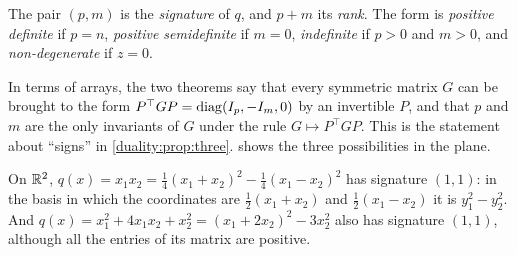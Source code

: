 \begin{notechapter}
\begin{definition}[Signature]\label{spectral-svd:def:signature}
The pair $(p, m)$ is the \emph{signature} of $q$, and $p + m$ its
\emph{rank}. The form is \emph{positive definite} if $p = n$,
\emph{positive semidefinite} if $m = 0$, \emph{indefinite} if $p > 0$ and
$m > 0$, and \emph{non-degenerate} if $z = 0$.
\end{definition}

In terms of arrays, the two theorems say that every symmetric matrix $G$
can be brought to the form $P^\top GP = \operatorname{diag}(I_p, -I_m, 0)$ by an
invertible $P$, and that $p$ and $m$ are the only invariants of $G$ under
the rule $G\mapsto P^\top GP$. This is the statement about ``signs'' in
\cref{duality:prop:three}.  shows the
three possibilities in the plane.

\begin{example}\label{spectral-svd:ex:squares}
On $\mathbb{R}^2$, $q(x) = x_1x_2 = \frac14(x_1 + x_2)^2 - \frac14(x_1 - x_2)^2$
has signature $(1, 1)$: in the basis in which the coordinates are
$\frac12(x_1 + x_2)$ and $\frac12(x_1 - x_2)$ it is $y_1^2 - y_2^2$. And
$q(x) = x_1^2 + 4x_1x_2 + x_2^2 = (x_1 + 2x_2)^2 - 3x_2^2$ also has
signature $(1, 1)$, although all the entries of its matrix are positive.
\end{example}


\end{notechapter}
